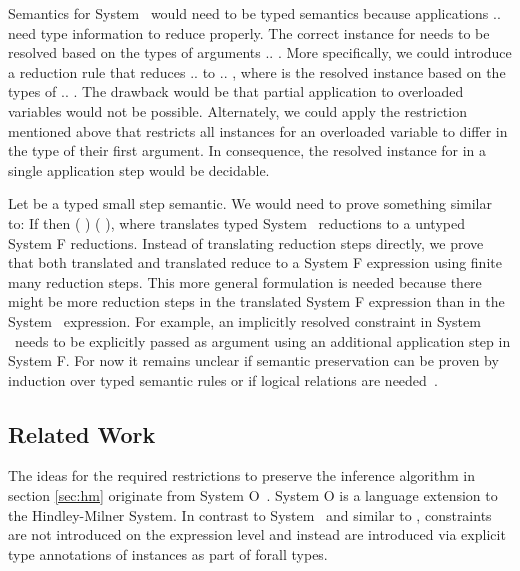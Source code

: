 \noindent Semantics for System \Fo\ would need to be typed semantics because applications      $..$   need type information to reduce properly.
The correct instance for  needs to be resolved based on the types of arguments  $..$ . 
More specifically, we could introduce a reduction rule  that reduces      $..$   to     $..$  , where  is the resolved instance based on the types of  $..$ . The drawback would be that partial application to overloaded variables would not be possible.
Alternately, we could apply the restriction mentioned above that restricts all instances for an overloaded variable  to differ in the type of their first argument.
In consequence, the resolved instance for  in a single application step     would be decidable.

\noindent Let    be a typed small step semantic. 
We would need to prove something similar to: If    then  \Constr{[}  \Constr{]} (   )  (   ), where  translates typed System \Fo\ reductions to a untyped System F reductions.
Instead of translating reduction steps directly, we prove that both translated  and translated  reduce to a System F expression  using finite many reduction steps.
This more general formulation is needed because there might be more reduction steps in the translated System F expression than in the System \Fo\ expression. 
For example, an implicitly resolved constraint in System \Fo\ needs to be explicitly passed as argument using an additional application step in System F. 
For now it remains unclear if semantic preservation can be proven by induction over typed semantic rules or if logical relations are needed~\cite{logrel}.

\subsection{Related Work}
The ideas for the required restrictions to preserve the inference algorithm in section \ref{sec:hm} originate from System O~\cite{syso}. 
System O is a language extension to the Hindley-Milner System. 
In contrast to System \Fo\ and similar to \HMo, constraints are not introduced on the expression level and instead are introduced via explicit type annotations of instances as part of forall types. 

